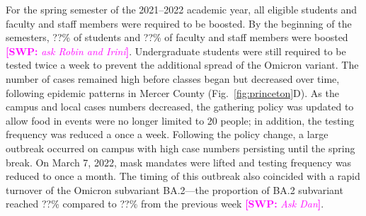 \documentclass[12pt]{article}
\newcommand{\fref}[1]{Fig.~\ref{fig:#1}}
\newcommand{\comment}[3]{\textcolor{#1}{\textbf{[#2: }\textsl{#3}\textbf{]}}}
\newcommand{\swp}[1]{\comment{magenta}{SWP}{#1}}
\begin{document}
For the spring semester of the 2021--2022 academic year, all eligible students and faculty and staff members were required to be boosted.
By the beginning of the semesters, ??\% of students and ??\% of faculty and staff members were boosted \swp{ask Robin and Irini}.
Undergraduate students were still required to be tested twice a week to prevent the additional spread of the Omicron variant.
The number of cases remained high before classes began but decreased over time, following epidemic patterns in Mercer County (\fref{princeton}D).
As the campus and local cases numbers decreased, the gathering policy was updated to allow food in events were no longer limited to 20 people;
in addition, the testing frequency was reduced a once a week.
Following the policy change, a large outbreak occurred on campus with high case numbers persisting until the spring break.
On March 7, 2022, mask mandates were lifted and testing frequency was reduced to once a month.
The timing of this outbreak also coincided with a rapid turnover of the Omicron subvariant BA.2---the proportion of BA.2 subvariant reached ??\% compared to ??\% from the previous week \swp{Ask Dan}.
\end{document}
